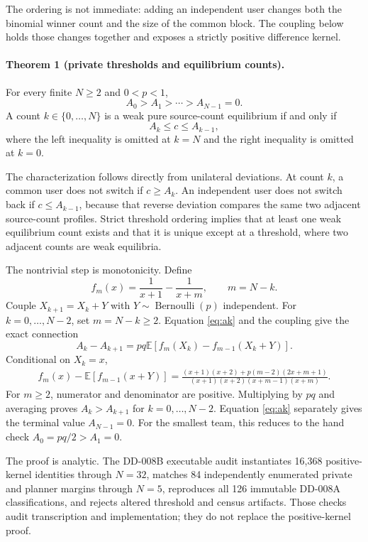 \documentclass[11pt]{article}
\newcommand{\E}{\mathbb{E}}
\begin{document}
The ordering is not immediate: adding an independent user changes both the
binomial winner count and the size of the common block. The coupling below
holds those changes together and exposes a strictly positive difference kernel.

\paragraph{Theorem 1 (private thresholds and equilibrium counts).}
For every finite $N\ge2$ and $0<p<1$,
\[
 A_0>A_1>\cdots>A_{N-1}=0.
\]
A count $k\in\{0,\ldots,N\}$ is a weak pure source-count equilibrium if and
only if
\begin{equation}
 A_k\le c\le A_{k-1},
 \label{eq:equilibrium-characterization}
\end{equation}
where the left inequality is omitted at $k=N$ and the right inequality is
omitted at $k=0$.

The characterization follows directly from unilateral deviations. At count
$k$, a common user does not switch if $c\ge A_k$. An independent user does not
switch back if $c\le A_{k-1}$, because that reverse deviation compares the same
two adjacent source-count profiles. Strict threshold ordering implies that at
least one weak equilibrium count exists and that it is unique except at a
threshold, where two adjacent counts are weak equilibria.

The nontrivial step is monotonicity. Define
\[
 f_m(x)=\frac{1}{x+1}-\frac{1}{x+m},
 \qquad m=N-k.
\]
Couple $X_{k+1}=X_k+Y$ with $Y\sim\operatorname{Bernoulli}(p)$ independent.
For $k=0,\ldots,N-2$, set $m=N-k\geq2$. Equation \eqref{eq:ak} and the
coupling give the exact connection
\[
 A_k-A_{k+1}
 =pq\E\left[f_m(X_k)-f_{m-1}(X_k+Y)\right].
\]
Conditional on $X_k=x$,
\begin{align}
 f_m(x)-\E[f_{m-1}(x+Y)]
 =\frac{(x+1)(x+2)+p(m-2)(2x+m+1)}
 {(x+1)(x+2)(x+m-1)(x+m)}.
 \label{eq:positive-kernel}
\end{align}
For $m\ge2$, numerator and denominator are positive. Multiplying by $pq$ and
averaging proves $A_k>A_{k+1}$ for $k=0,\ldots,N-2$. Equation
\eqref{eq:ak} separately gives the terminal value $A_{N-1}=0$. For the
smallest team, this reduces to the hand check $A_0=pq/2>A_1=0$.

The proof is analytic. The DD-008B executable audit instantiates 16,368
positive-kernel identities through $N=32$, matches 84 independently enumerated
private and planner margins through $N=5$, reproduces all 126 immutable DD-008A
classifications, and rejects altered threshold and census artifacts. Those
checks audit transcription and implementation; they do not replace the
positive-kernel proof.
\end{document}
